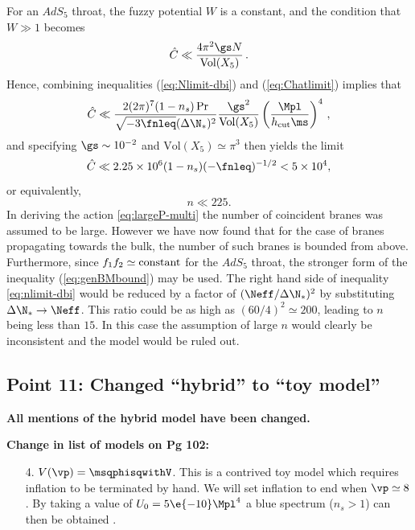 For an $AdS_5$ throat, the fuzzy potential $W$ is a constant,
and the condition that $W \gg 1$ becomes 
% 
\begin{equation}
\label{eq:Chatlimit}
\hat{C} \ll \frac{4\pi^2\gs N}{\mathrm{Vol}(X_5)} \,.
\end{equation}
% 
Hence, combining inequalities 
(\ref{eq:Nlimit-dbi}) and (\ref{eq:Chatlimit}) implies that
%  
\begin{equation}
\label{eq:nlimit-dbi}
\hat{C} \ll 
\frac{2 (2\pi)^7 (1-n_s)\Pr}{\sqrt{-3\fnleq} ( \Delta \N_*)^2}
\frac{\gs^2}{\mathrm{Vol} (X_5) }
\left( \frac{\Mpl}{h_{\rm cut}\ms} \right)^4  \,,
\end{equation}
% 
and specifying $\gs \sim 10^{-2}$ and 
$\mathrm{Vol}(X_5) \simeq \pi^3$ then yields the limit  
% 
\begin{equation}
\hat{C} \ll 2.25\times 10^{6} (1-n_s)(-\fnleq)^{-1/2} < 5\times 10^4,
\end{equation}
% 
 or equivalently,
%   
\begin{equation}
\label{eq:nbound-multi}
n \ll 225.
\end{equation}
% 
In deriving the action \eqref{eq:largeP-multi} the number of coincident branes was assumed to be
large. However we have now found that for the case of branes propagating towards the bulk, the
number of such branes is bounded from above.
Furthermore, since $f_1f_2 \simeq {\rm constant}$ for the $AdS_5$ throat, 
the stronger form of the inequality (\ref{eq:genBMbound}) may be used. The right hand side of
inequality \eqref{eq:nlimit-dbi} would be reduced by a factor of $(   \Neff /\Delta \N_*)^2$ by
substituting 
$\Delta \N_* \rightarrow \Neff$. This ratio 
could be as high as $(60/4)^2 \simeq 200 $, leading to $n$ being less than $15$. In this case
the assumption of large $n$ would clearly be inconsistent and the model would be ruled out. 

\subsection{Point 11: Changed ``hybrid'' to ``toy model''}
\textbf{All mentions of the hybrid model have been changed.}

\textbf{Change in list of models on Pg 102:}
\begin{enumerate}
\item[4.] $V(\vp) = \msqphisqwithV$. This is a contrived toy model which requires inflation to
be terminated by hand. We will set inflation to end when $\vp \simeq 8$. By taking a value
of $U_0 = 5\e{-10}\Mpl^{4}$ a blue spectrum ($n_s>1$) can then be obtained
\cite{Linde:1993cn,Komatsu:2008hk}.
\end{enumerate}

